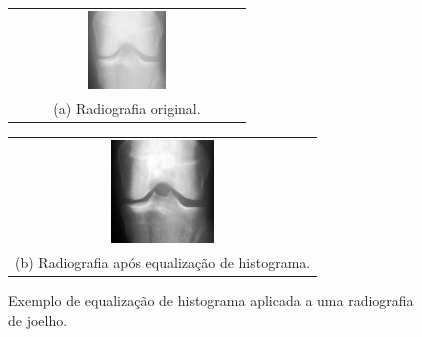 \begin{figure}[ht]
    \centering
    \begin{tabular}{@{}c@{}}
        \includegraphics[width=0.35\textwidth]{figs/imagem-nao-equalizada.png} \\[\abovecaptionskip]
        \small (a) Radiografia original.
    \end{tabular}
    \hfill
    \begin{tabular}{@{}c@{}}
        \includegraphics[width=0.35\textwidth]{figs/image-equalizada.png} \\[\abovecaptionskip]
        \small (b) Radiografia após equalização de histograma.
    \end{tabular}
    \caption{Exemplo de equalização de histograma aplicada a uma radiografia de joelho.}
    \label{fig:histogram-equalization}
\end{figure}

